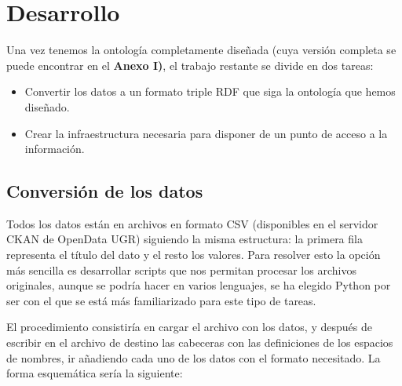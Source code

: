\chapter{Desarrollo}

Una vez tenemos la ontología completamente diseñada (cuya versión completa se puede encontrar en el \textbf{Anexo I)}, el trabajo restante se divide en dos tareas:

\begin{itemize}
	\item Convertir los datos a un formato triple {\sf RDF} que siga la ontología que hemos diseñado.
	\item Crear la infraestructura necesaria para disponer de un punto de acceso a la información.
\end{itemize}

\section{Conversión de los datos}

Todos los datos están en archivos en formato {\sf CSV} (disponibles en el servidor C{\sf KAN} de {\sf OpenData UGR}) siguiendo la misma estructura: la primera fila representa el título del dato y el resto los valores. Para resolver esto la opción más sencilla es desarrollar scripts que nos permitan procesar los archivos originales, aunque se podría hacer en varios lenguajes, se ha elegido {\sf Python} por ser con el que se está más familiarizado para este tipo de tareas.

\bigskip
El procedimiento consistiría en cargar el archivo con los datos, y después de escribir en el archivo de destino las cabeceras con las definiciones de los espacios de nombres, ir añadiendo cada uno de los datos con el formato necesitado. La forma esquemática sería la siguiente: 

